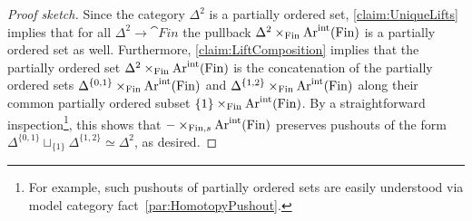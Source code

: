 \begin{proof}[Proof sketch]
	Since the category $\Delta^2$ is a partially ordered set, \cref{claim:UniqueLifts} implies that for all $\Delta^2\rightarrow \cat{Fin}$ the pullback $\Delta^2\times_{\mathrm{Fin}}\operatorname{Ar}^\mathrm{int}(\mathrm{Fin})$ is a partially ordered set as well. Furthermore, \cref{claim:LiftComposition} implies that the partially ordered set $\Delta^2\times_{\mathrm{Fin}}\operatorname{Ar}^\mathrm{int}(\mathrm{Fin})$ is the concatenation of the partially ordered sets $\Delta^{\{0,1\}}\times_{\mathrm{Fin}}\operatorname{Ar}^\mathrm{int}(\mathrm{Fin})$ and $\Delta^{\{1,2\}}\times_{\mathrm{Fin}}\operatorname{Ar}^\mathrm{int}(\mathrm{Fin})$ along their common partially ordered subset $\{1\}\times_{\mathrm{Fin}}\operatorname{Ar}^\mathrm{int}(\mathrm{Fin})$. By a straightforward inspection\footnote{For example, such pushouts of partially ordered sets are easily understood via model category fact~\cref{par:HomotopyPushout}.}, this shows that $-\times_{\mathrm{Fin},s}\operatorname{Ar}^\mathrm{int}(\mathrm{Fin})$ preserves pushouts of the form $\Delta^{\{0,1\}}\sqcup_{\{1\}}\Delta^{\{1,2\}}\simeq \Delta^2$, as desired.
\end{proof}
